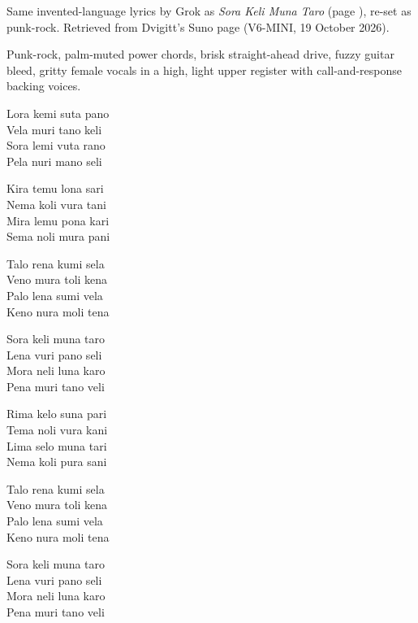 
\label{sec:kimi-sela}
\begin{notes}
Same invented-language lyrics by Grok as \emph{Sora Keli Muna Taro} (page \pageref{sec:sora-keli-muna-taro}), re-set as punk-rock. Retrieved from Dvigitt's Suno page (V6-MINI, 19 October 2026).
\end{notes}
\begin{style}
Punk-rock, palm-muted power chords, brisk straight-ahead drive, fuzzy guitar bleed, gritty female vocals in a high, light upper register with call-and-response backing voices.
\end{style}
\begin{lyrics}
Lora kemi suta pano\\
Vela muri tano keli\\
Sora lemi vuta rano\\
Pela nuri mano seli

Kira temu lona sari\\
Nema koli vura tani\\
Mira lemu pona kari\\
Sema noli mura pani

Talo rena kumi sela\\
Veno mura toli kena\\
Palo lena sumi vela\\
Keno nura moli tena

Sora keli muna taro\\
Lena vuri pano seli\\
Mora neli luna karo\\
Pena muri tano veli

Rima kelo suna pari\\
Tema noli vura kani\\
Lima selo muna tari\\
Nema koli pura sani

Talo rena kumi sela\\
Veno mura toli kena\\
Palo lena sumi vela\\
Keno nura moli tena

Sora keli muna taro\\
Lena vuri pano seli\\
Mora neli luna karo\\
Pena muri tano veli


\end{lyrics}
